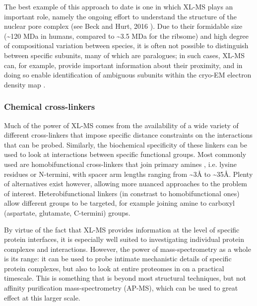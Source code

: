 \documentclass[a4paper,11pt,twoside,openright]{scrbook}
\begin{document}
The best example of this approach to date is one in which XL-MS plays an important role, namely the ongoing effort to understand the structure of the nuclear pore complex (see Beck and Hurt, 2016 \cite{Beck2016}). Due to their formidable size (\textasciitilde 120 MDa in humans, compared to \textasciitilde 3.5 MDa for the ribsome) and high degree of compositional variation between species, it is often not possible to distinguish between specific subunits, many of which are paralogues; in such cases, XL-MS can, for example, provide important information about their proximity, and in doing so enable identification of ambiguous subunits within the cryo-EM electron density map \cite{Bui2013}.

\subsubsection{Chemical cross-linkers}
Much of the power of XL-MS comes from the availability of a wide variety of different cross-linkers that impose specific distance constraints on the interactions that can be probed. Similarly, the biochemical specificity of these linkers can be used to look at interactions between specific functional groups. Most commonly used are homobifunctional cross-linkers that join primary amines \cite{Leitner2016}, i.e. lysine residues or N-termini, with spacer arm lengths ranging from \textasciitilde 3Å to \textasciitilde 35Å. Plenty of alternatives exist however, allowing more nuanced approaches to the problem of interest. Heterobifunctional linkers (in constrast to homobifunctional ones) allow different groups to be targeted, for example joining amine to carboxyl (aspartate, glutamate, C-termini) groups.

By virtue of the fact that XL-MS provides information at the level of specific protein interfaces, it is especially well suited to investigating individual protein complexes and interactions. However, the power of mass-spectrometry as a whole is its range: it can be used to probe intimate mechanistic details of specific protein complexes, but also to look at entire proteomes in on a practical timescale. This is something that is beyond most structural techniques, but not affinity purification mass-spectrometry (AP-MS), which can be used to great effect at this larger scale.

\end{document}

